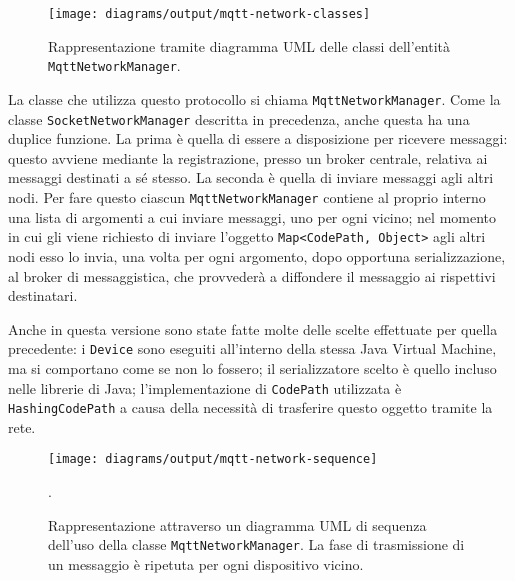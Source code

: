 \begin{figure}
  \centering
  \texttt{[image: diagrams/output/mqtt-network-classes]}
  \caption{Rappresentazione tramite diagramma UML delle classi dell'entità
    \texttt{MqttNetworkManager}.}
  \label{fig:emulated-network-classes}
\end{figure}

La classe che utilizza questo protocollo si chiama
\texttt{MqttNetworkManager}. Come la classe \texttt{SocketNetworkManager}
descritta in precedenza, anche questa ha una duplice funzione. La prima è quella
di essere a disposizione per ricevere messaggi: questo avviene mediante la
registrazione, presso un broker centrale, relativa ai messaggi destinati a sé
stesso. La seconda è quella di inviare messaggi agli altri nodi. Per fare questo
ciascun \texttt{MqttNetworkManager} contiene al proprio interno una lista di
argomenti a cui inviare messaggi, uno per ogni vicino; nel momento in cui gli
viene richiesto di inviare l'oggetto \texttt{Map<CodePath, Object>} agli altri
nodi esso lo invia, una volta per ogni argomento, dopo opportuna
serializzazione, al broker di messaggistica, che provvederà a diffondere il
messaggio ai rispettivi destinatari.

Anche in questa versione sono state fatte molte delle scelte effettuate per
quella precedente: i \texttt{Device} sono eseguiti all'interno della stessa Java
Virtual Machine, ma si comportano come se non lo fossero; il serializzatore
scelto è quello incluso nelle librerie di Java; l'implementazione di
\texttt{CodePath} utilizzata è \texttt{HashingCodePath} a causa della necessità
di trasferire questo oggetto tramite la rete.

\begin{figure}
  \centering
  \texttt{[image: diagrams/output/mqtt-network-sequence]}
  \caption{Rappresentazione attraverso un diagramma UML di sequenza dell'uso
    della classe \texttt{MqttNetworkManager}. La fase di trasmissione di un
    messaggio è ripetuta per ogni dispositivo vicino.}
    .\label{fig:emulated-network-sequence}
\end{figure}